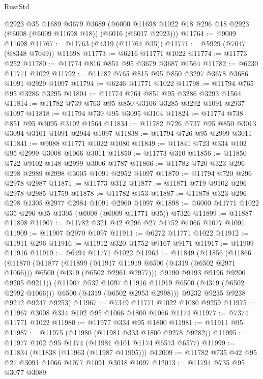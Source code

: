 \begin{lexlean}{RustStd}
\begin{coremodule}
    @2923
    @35
    @1689
    @3679
    @3689
    (@6000 @11698 @1022 @18 @296 @18 @2923 (@6008 (@6009 @11698 @18)) (@6016 (@6017 @2923)))
@11764 := @9009 @11698
@11767 := @11763 (@4319 (@11764 @35))
@11771 := @5929 (@7047 (@8348 @7049)) @11698
@11773 := @6216 @11771 @1022
@11774 := @11773 @252
@11780 := @11774 @816 @851 @95 @3679 @3687 @1564
@11782 := @6230 @11771 @1022
@11792 := @11782 @765 @815 @95 @850 @3297 @3678 @3686 @1091 @2929 @1097
@11794 := @6246 @11771 @1022
@11798 := @11794 @765 @95 @3286 @3295
@11804 := @11774 @764 @851 @95 @3286 @3293 @1564
@11814 := @11782 @739 @763 @95 @850 @3106 @3285 @3292 @1091 @2937 @1097
@11818 := @11794 @739 @95 @3095 @3104
@11824 := @11774 @738 @851 @95 @3095 @3102 @1564
@11834 := @11782 @726 @737 @95 @850 @3013 @3094 @3101 @1091 @2944 @1097
@11838 := @11794 @726 @95 @2999 @3011
@11841 := @9088 @11771 @1022 @1080
@11849 := @11841 @723 @334 @102 @95 @2999 @3008 @1066 @3011
@11850 := @11773 @310
@11856 := @11850 @722 @9102 @148 @2999 @3006 @1787
@11866 := @11782 @720 @323 @296 @298 @2989 @2998 @3005 @1091 @2952 @1097
@11870 := @11794 @720 @296 @2978 @2987
@11871 := @11773 @312
@11877 := @11871 @719 @9102 @296 @2978 @2985 @1759
@11878 := @11782 @153
@11887 := @11878 @323 @296 @298 @1305 @2977 @2984 @1091 @2960 @1097
@11898 := @6000 @11771 @1022 @35 @296 @35 @1305 (@6008 (@6009 @11771 @35)) @7326
@11899 := @11887 @11898
@11907 := @11782 @321 @42 @296 @27 @1752 @1066 @1077 @1091
@11909 := @11907 @2970 @1097
@11911 := @6272 @11771 @1022
@11912 := @11911 @296
@11916 := @11912 @320 @1752 @9167 @9171
@11917 := @11909 @11916
@11919 := @6494 @11771 @1022
@11963 := @11849
    (@11856
      (@11866
        (@11870
          (@11877
            (@11899
              (@11917 @11919 @6500 (@4319 (@6502 @2971 @1066)))
              @6500
              (@4319 (@6502 @2961 @2977)))
            @9190
            @9193
            @9196
            @9200
            @9205
            @9211))
        (@11907 @532 @1097 @11916 @11919 @6500 (@4319 (@6502 @2992 @1066)))
        @6500
        (@4319 (@6502 @2953 @2998)))
      @9232
      @9235
      @9238
      @9242
      @9247
      @9253)
@11967 := @7349 @11771 @1022 @1080 @9259
@11975 := @11967 @3008 @334 @102 @95 @1066 @1800 @1066 @1174
@11977 := @7374 @11771 @1022
@11980 := @11977 @334 @95 @1800
@11981 := @11911 @95
@11987 := @11975 (@11980 (@11981 @333 @1800 @9278 @9282))
@11995 := @11977 @102 @95 @1174 (@11981 @101 @1174 @6573 @6577)
@11999 := @11834 (@11838 (@11963 (@11987 @11995)))
@12009 := @11782 @735 @42 @95 @27 @3091 @1066 @1077 @1091 @3018 @1097
@12013 := @11794 @735 @95 @3077 @3089

\end{coremodule}
\end{lexlean}
